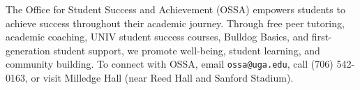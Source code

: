 The Office for Student Success and Achievement (OSSA) empowers students to achieve success throughout their academic journey. Through free peer tutoring, academic coaching, UNIV student success courses, Bulldog Basics, and first-generation student support, we promote well-being, student learning, and community building. To connect with OSSA, email \texttt{ossa@uga.edu}, call (706) 542-0163, or visit Milledge Hall (near Reed Hall and Sanford Stadium).
